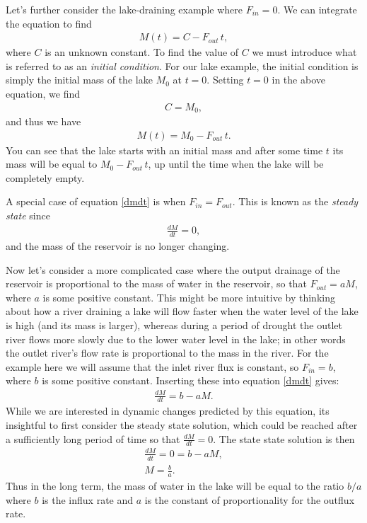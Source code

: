 \documentclass[11pt, oneside]{article}   	%
\begin{document}
Let's further consider the   lake-draining example where  $F_{in}=0$. We can integrate the equation to find
\begin{eqnarray}
M(t) = C - F_{out}\, t ,
\end{eqnarray}
where $C$ is an unknown constant.  To find the value of $C$ we must introduce what is referred to as an {\it initial condition}. For our lake example, the initial condition is simply the initial mass of the lake $M_0$ at $t=0$.  Setting $t=0$ in the above equation, we find
\begin{eqnarray}
C = M_0,
\end{eqnarray}
and thus we have
\begin{eqnarray}
M(t) = M_0 - F_{out}\, t.
\end{eqnarray}
You can see that the lake starts with an initial mass and after some time $t$ its mass will be equal to $M_0 - F_{out}\, t$, up until the time when the lake will be completely empty.

A special case of equation \ref{dmdt} is when $F_{in}=F_{out}$. This is known as the {\it steady state} since 
\begin{eqnarray}
\frac{dM}{dt} = 0,
\end{eqnarray}
and the mass of the reservoir is no longer changing.

Now let's consider a more complicated case where the output drainage of the reservoir is proportional to the mass of water in the reservoir, so that $F_{out} = a M$, where $a$ is some positive constant.  This might be more intuitive by thinking about how a river draining a lake will flow faster when the water level of the lake is high (and its mass is larger), whereas during a period of drought  the outlet river flows more slowly due to the lower water level in the lake; in other words the outlet river's flow rate is proportional to the mass in the river.  For the example here we will assume that the inlet river flux is constant, so $F_{in} = b$, where $b$ is some positive constant.  Inserting these into equation \ref{dmdt} gives:
\begin{eqnarray}
\frac{dM}{dt} = b - a M \label{aM}.
\end{eqnarray}
While we are interested in dynamic changes predicted by this equation, its insightful to first consider the steady state solution, which could be reached after a sufficiently long period of time so that $\frac{dM}{dt} = 0$. The state state solution is then
\begin{eqnarray}
\frac{dM}{dt} = 0 = b - a M, \\
M = \frac{b}{a}.
\end{eqnarray}
Thus in the long term, the mass of water in the lake will be equal to the ratio $b/a$ where $b$ is the influx rate and $a$ is the constant of proportionality for the outflux rate. 
\end{document}
